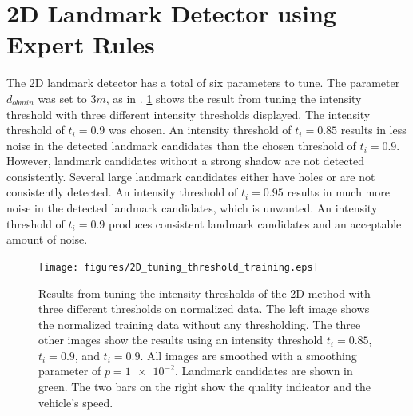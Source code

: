 \section{2D Landmark Detector using Expert Rules}

The 2D landmark detector has a total of six parameters to tune. The parameter $d_{ob min}$ was set to $3 m $, as in \cite{Leblond2019SonarProject}. \cref{fig:2D_tuning_intensity_thres} shows the result from tuning the intensity threshold with three different intensity thresholds displayed. The intensity threshold of $t_i = 0.9$ was chosen. An intensity threshold of $t_i = 0.85$ results in less noise in the detected landmark candidates than the chosen threshold of $t_i = 0.9$. However, landmark candidates without a strong shadow are not detected consistently. Several large landmark candidates either have holes or are not consistently detected. An intensity threshold of $t_i = 0.95$ results in much more noise in the detected landmark candidates, which is unwanted. An intensity threshold of $t_i = 0.9$ produces consistent landmark candidates and an acceptable amount of noise. 

\begin{figure}[ht]  %
  \centering
  \texttt{[image: figures/2D\_tuning\_threshold\_training.eps]}
  \caption[Results of tuning intensity threshold the 2D method]{Results from tuning the intensity thresholds of the 2D method with three different thresholds on normalized data. The left image shows the normalized training data without any thresholding. The three other images show the results using an intensity threshold $t_i = 0.85$, $t_i = 0.9$, and $t_i = 0.9$. All images are smoothed with a smoothing parameter of $p = \num{1e-2}$. Landmark candidates are shown in green. The two bars on the right show the quality indicator and the vehicle's speed.}
  \label{fig:2D_tuning_intensity_thres}
\end{figure}

